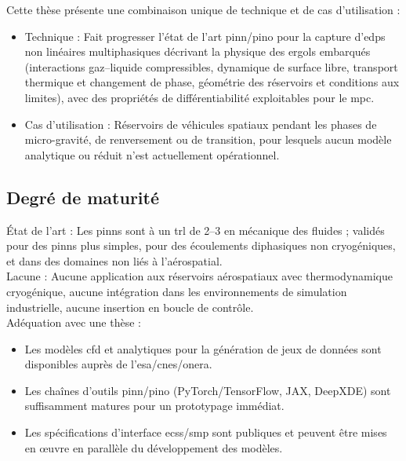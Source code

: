 \documentclass[12pt]{article}
\begin{document}
	
	
	Cette thèse présente une combinaison unique de technique et de cas d’utilisation :
	
	\begin{itemize}
		\item Technique : Fait progresser l’état de l’art \acrshort{pinn}/\acrshort{pino} pour la capture d’\acrshort{edps} non linéaires multiphasiques décrivant la physique des ergols embarqués (interactions gaz–liquide compressibles, dynamique de surface libre, transport thermique et changement de phase, géométrie des réservoirs et conditions aux limites), avec des propriétés de différentiabilité exploitables pour le \gls{mpc}.
		
		\item Cas d’utilisation : Réservoirs de véhicules spatiaux pendant les phases de micro-gravité, de renversement ou de transition, pour lesquels aucun modèle analytique ou réduit n’est actuellement opérationnel.
	\end{itemize}
	
	
	\subsection*{Degré de maturité}
	
	
	État de l’art : Les \acrshort{pinn}s sont à un \acrshort{trl} de 2–3 en mécanique des fluides ; validés pour des \acrshort{pinn}s plus simples, pour des écoulements diphasiques non cryogéniques, et dans des domaines non liés à l’aérospatial.
	\\
	
	Lacune : Aucune application aux réservoirs aérospatiaux avec thermodynamique cryogénique, aucune intégration dans les environnements de simulation industrielle, aucune insertion en boucle de contrôle.
	\\
	
	Adéquation avec une thèse :
	
	\begin{itemize}
		\item Les modèles \acrshort{cfd} et analytiques pour la génération de jeux de données sont disponibles auprès de l’\acrshort{esa}/\acrshort{cnes}/\acrshort{onera}.
		
		\item Les chaînes d’outils \acrshort{pinn}/\acrshort{pino} (PyTorch/TensorFlow, JAX, DeepXDE) sont suffisamment matures pour un prototypage immédiat.
		
		\item Les spécifications d’interface \acrshort{ecss}/\acrshort{smp} sont publiques et peuvent être mises en œuvre en parallèle du développement des modèles.
		
	\end{itemize}	
	
\end{document}
